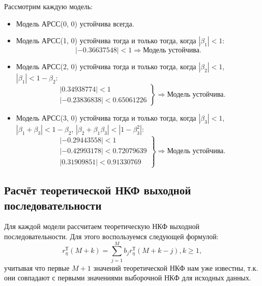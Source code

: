 \documentclass[12pt, fleqn]{article}
\begin{document}
{{		Рассмотрим каждую модель:
		\begin{itemize}
			\item {
				Модель АРСС(0, 0) устойчива всегда.
			}
			\item {
				Модель АРСС(1, 0) устойчива тогда и только тогда, когда $\left| \beta_1 \right| < 1$:
				\begin{equation*}
					\left|  -0.36637548 \right| < 1 \Rightarrow \text{Модель устойчива}.
				\end{equation*}
			}
			\item {
				Модель АРСС(2, 0) устойчива тогда и только тогда, когда $\left| \beta_2 \right| < 1$, $\left| \beta_1 \right| < 1 - \beta_2$:
				\begin{equation*}
					\left.
					\begin{split}
						&\left| 0.34938774 \right| < 1 \\
						&\left| -0.23836838 \right| < 0.65061226
					\end{split}
					\right\} \Rightarrow \text{Модель устойчива}.
				\end{equation*}
			}
			\item {		
				Модель АРСС(3, 0) устойчива тогда и только тогда, когда $\left| \beta_3 \right| < 1$, $\left| \beta_1 + \beta_3 \right| < 1 - \beta_2$, $\left| \beta_2 + \beta_1 \beta_3 \right| < \left| 1 - \beta^2_3 \right|$:
				\begin{equation*}
					\left.
					\begin{split}
						&\left| -0.29443558 \right| < 1 \\
						&\left| -0.42993178 \right| < 0.72079639 \\
						&\left|  0.31909851 \right| < 0.91330769
					\end{split}
					\right\} \Rightarrow \text{Модель устойчива}.
				\end{equation*}
			}
		\end{itemize}
	}
					
	\subsection{Расчёт теоретической НКФ выходной последовательности} {
		Для каждой модели рассчитаем теоретическую НКФ выходной последовательности. Для этого воспользуемся следующей формулой:
		\begin{equation}
			r_{\eta}^{\text{Т}}(M + k) = \sum_{j=1}^{M}{b_j r_{\eta}^{\text{Т}}(M + k - j)}, k \geq 1,
		\end{equation}
		учитывая что первые $M + 1$ значений теоретической НКФ нам уже известны, т.к. они совпадают с первыми значениями выборочной НКФ для исходных данных. \medskip
				
}}
\end{document}
